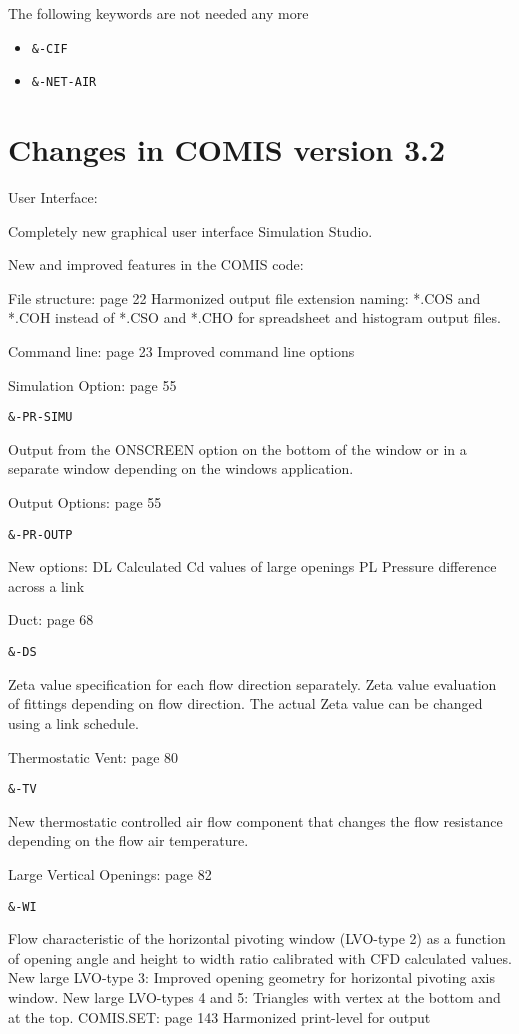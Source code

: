 \documentclass[10pt]{book}
\begin{document}
The following keywords are not needed any more

\begin{itemize}
\item\verb|&-CIF|
\item\verb|&-NET-AIR|
\end{itemize}

\section{Changes in COMIS version 3.2}

User Interface:

Completely new graphical user interface Simulation Studio.


New and improved features in the COMIS code:

File structure: page 22 Harmonized output file extension naming: *.COS and *.COH instead of *.CSO and *.CHO for spreadsheet and histogram output files.

Command line: page 23 Improved command line options

Simulation Option: page 55

\verb|&-PR-SIMU|

Output from the ONSCREEN option on the bottom of the window or in a separate window depending on the windows application.

Output Options: page 55

\verb|&-PR-OUTP|

New options: 
DL Calculated Cd values of large openings 
PL Pressure difference across a link 


Duct: page 68

\verb|&-DS|

Zeta value specification for each flow direction separately. 
Zeta value evaluation of fittings depending on flow direction. 
The actual Zeta value can be changed using a link schedule. 


Thermostatic Vent: page 80

\verb|&-TV|

New thermostatic controlled air flow component that changes the flow resistance depending on the flow air temperature.

Large Vertical Openings: page 82

\verb|&-WI|

Flow characteristic of the horizontal pivoting window (LVO-type 2) as a function of opening angle and height to width ratio calibrated with CFD calculated values. New large LVO-type 3: Improved opening geometry for horizontal pivoting axis window. New large LVO-types 4 and 5: Triangles with vertex at the bottom and at the top. COMIS.SET: page 143 Harmonized print-level for output
\end{document}
